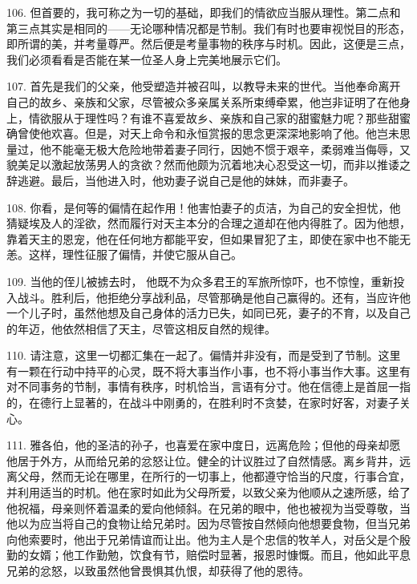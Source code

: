 106. 但首要的，我可称之为一切的基础，即我们的情欲应当服从理性。第二点和第三点其实是相同的——无论哪种情况都是节制。我们有时也要审视悦目的形态，即所谓的美，并考量尊严。然后便是考量事物的秩序与时机。因此，这便是三点，我们必须看看是否能在某一位圣人身上完美地展示它们。\par

107. 首先是我们的父亲，他受塑造并被召叫，以教导未来的世代。当他奉命离开自己的故乡、亲族和父家，尽管被众多亲属关系所束缚牵累，他岂非证明了在他身上，情欲服从于理性吗？有谁不喜爱故乡、亲族和自己家的甜蜜魅力呢？那些甜蜜确曾使他欢喜。但是，对天上命令和永恒赏报的思念更深深地影响了他。他岂未思量过，他不能毫无极大危险地带着妻子同行，因她不惯于艰辛，柔弱难当侮辱，又貌美足以激起放荡男人的贪欲？然而他颇为沉着地决心忍受这一切，而非以推诿之辞逃避。最后，当他进入时，他劝妻子说自己是他的妹妹，而非妻子。\par

108. 你看，是何等的偏情在起作用！他害怕妻子的贞洁，为自己的安全担忧，他猜疑埃及人的淫欲，然而履行对天主本分的合理之道却在他内得胜了。因为他想，靠着天主的恩宠，他在任何地方都能平安，但如果冒犯了主，即使在家中也不能无恙。这样，理性征服了偏情，并使它服从自己。\par

109. 当他的侄儿被掳去时， 他既不为众多君王的军旅所惊吓，也不惊惶，重新投入战斗。胜利后，他拒绝分享战利品，尽管那确是他自己赢得的。还有，当应许他一个儿子时，虽然他想及自己身体的活力已失，如同已死，妻子的不育，以及自己的年迈，他依然相信了天主，尽管这相反自然的规律。\par

110. 请注意，这里一切都汇集在一起了。偏情并非没有，而是受到了节制。这里有一颗在行动中持平的心灵，既不将大事当作小事，也不将小事当作大事。这里有对不同事务的节制，事情有秩序，时机恰当，言语有分寸。他在信德上是首屈一指的，在德行上显著的，在战斗中刚勇的，在胜利时不贪婪，在家时好客，对妻子关心。\par

111. 雅各伯，他的圣洁的孙子，也喜爱在家中度日，远离危险；但他的母亲却愿他居于外方，从而给兄弟的忿怒让位。健全的计议胜过了自然情感。离乡背井，远离父母，然而无论在哪里，在所行的一切事上，他都遵守恰当的尺度，行事合宜，并利用适当的时机。他在家时如此为父母所爱，以致父亲为他顺从之速所感，给了他祝福，母亲则怀着温柔的爱向他倾斜。在兄弟的眼中，他也被视为当受尊敬，当他以为应当将自己的食物让给兄弟时。因为尽管按自然倾向他想要食物，但当兄弟向他索要时，他出于兄弟情谊而让出。他为主人是个忠信的牧羊人，对岳父是个殷勤的女婿；他工作勤勉，饮食有节，赔偿时显著，报恩时慷慨。而且，他如此平息兄弟的忿怒，以致虽然他曾畏惧其仇恨，却获得了他的恩待。\par


